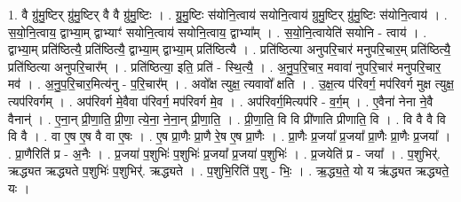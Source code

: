 \documentclass[17pt]{extarticle}
\begin{document}
1. वै ग्रु॑मु॒ष्टिर् ग्रु॑मु॒ष्टिर् वै वै ग्रु॑मु॒ष्टिः । . ग्रु॒मु॒ष्टिः स॑योनि॒त्वाय॑ सयोनि॒त्वाय॑ ग्रुमु॒ष्टिर् ग्रु॑मु॒ष्टिः स॑योनि॒त्वाय॑ । . स॒यो॒नि॒त्वाय॒ द्वाभ्या॒म् द्वाभ्याꣳ॑ सयोनि॒त्वाय॑ सयोनि॒त्वाय॒ द्वाभ्या᳚म् । . स॒यो॒नि॒त्वायेति॑ सयोनि - त्वाय॑ । . द्वाभ्या॒म् प्रति॑ष्ठित्यै॒ प्रति॑ष्ठित्यै॒ द्वाभ्या॒म् द्वाभ्या॒म् प्रति॑ष्ठित्यै । . प्रति॑ष्ठित्या अनुपरि॒चार॑ मनुपरि॒चार॒म् प्रति॑ष्ठित्यै॒ प्रति॑ष्ठित्या अनुपरि॒चार᳚म् । . प्रति॑ष्ठित्या॒ इति॒ प्रति॑ - स्थि॒त्यै॒ । . अ॒नु॒प॒रि॒चार॒ मवावा॑ नुपरि॒चार॑ मनुपरि॒चार॒ मव॑ । . अ॒नु॒प॒रि॒चार॒मित्य॑नु - प॒रि॒चार᳚म् । . अवो᳚क्ष त्युक्ष॒ त्यवावो᳚ क्षति । . उ॒क्ष॒त्य प॑रिवर्ग॒ मप॑रिवर्ग मुक्ष त्युक्ष॒ त्यप॑रिवर्गम् । . अप॑रिवर्ग मे॒वैवा प॑रिवर्ग॒ मप॑रिवर्ग मे॒व । . अप॑रिवर्ग॒मित्यप॑रि - व॒र्ग॒म् । . ए॒वैना॑ नेना ने॒वै वैनान्॑ । . ए॒ना॒न् प्री॒णा॒ति॒ प्री॒णा॒ त्ये॒ना॒ ने॒ना॒न् प्री॒णा॒ति॒ । . प्री॒णा॒ति॒ वि वि प्री॑णाति प्रीणाति॒ वि । . वि वै वै वि वि वै । . वा ए॒ष ए॒ष वै वा ए॒षः । . ए॒ष प्रा॒णैः प्रा॒णै रे॒ष ए॒ष प्रा॒णैः । . प्रा॒णैः प्र॒जया᳚ प्र॒जया᳚ प्रा॒णैः प्रा॒णैः प्र॒जया᳚ । . प्रा॒णैरिति॑ प्र - अ॒नैः । . प्र॒जया॑ प॒शुभिः॑ प॒शुभिः॑ प्र॒जया᳚ प्र॒जया॑ प॒शुभिः॑ । . प्र॒जयेति॑ प्र - जया᳚ । . प॒शुभिर्॑. ऋद्ध्यत ऋद्ध्यते प॒शुभिः॑ प॒शुभिर्॑. ऋद्ध्यते । . प॒शुभि॒रिति॑ प॒शु - भिः॒ । . ऋ॒द्ध्य॒ते॒ यो य ऋ॑द्ध्यत ऋद्ध्यते॒ यः । \newline
\end{document}
